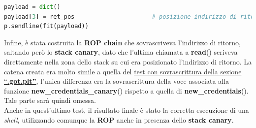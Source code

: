 \begin{lstlisting}[language=Python, label=pointer-over, caption={Invio input per sovrascrittura indirizzo puntatore con posizione nello stack dell'indirizzo di ritorno.}, style =Python]
payload = dict()
payload[3] = ret_pos                      # posizione indirizzo di ritorno
p.sendline(fit(payload))
\end{lstlisting}
Infine, è stata costruita la \textbf{ROP chain} che sovrascriveva l'indirizzo di ritorno, saltando però lo \textbf{stack canary}, dato che l'ultima chiamata a \textbf{read}() scriveva direttamente nella zona dello stack su cui era posizionato l'indirizzo di ritorno.
La catena creata era molto simile a quella del \hyperref[subsec:Test_3-2]{test con sovrascrittura della sezione ``\textbf{.got.plt''}}, l'unica differenza era la sovrascrittura della voce associata alla funzione \textbf{new\_credentials\_canary}() rispetto a quella di 
\textbf{new\_credentials}(). Tale parte sarà quindi omessa.\\
Anche in quest'ultimo test, il risultato finale è stato la corretta esecuzione di una \textit{shell}, utilizzando comunque la \textbf{ROP} anche in presenza dello \textbf{stack canary}.